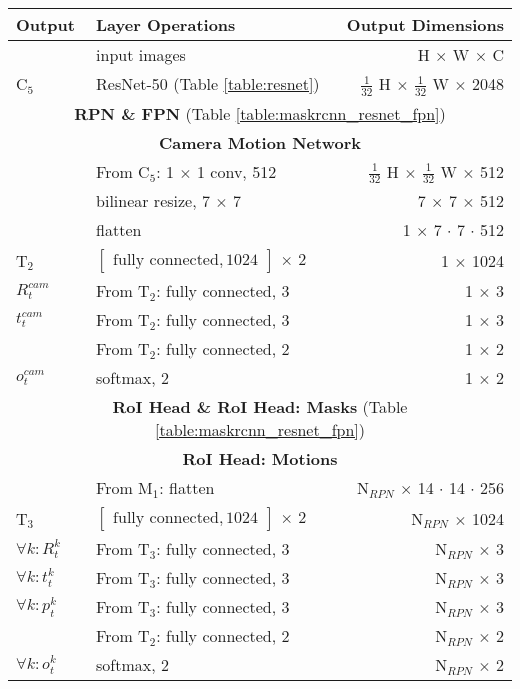 {
\begin{table}[h]
\centering
\begin{tabular}{llr}
\toprule
\textbf{Output} & \textbf{Layer Operations} & \textbf{Output Dimensions} \\
\midrule\midrule
& input images & H $\times$ W $\times$ C \\
\midrule
C$_5$ & ResNet-50 (Table \ref{table:resnet}) & $\tfrac{1}{32}$ H $\times$ $\tfrac{1}{32}$ W $\times$ 2048 \\
\midrule
\multicolumn{3}{c}{\textbf{RPN \& FPN} (Table \ref{table:maskrcnn_resnet_fpn})} \\
\midrule
\multicolumn{3}{c}{\textbf{Camera Motion Network}}\\
\midrule
& From C$_5$: 1 $\times$ 1 conv, 512 & $\tfrac{1}{32}$ H $\times$ $\tfrac{1}{32}$ W $\times$ 512 \\
& bilinear resize, 7 $\times$ 7 & 7 $\times$ 7 $\times$ 512 \\
& flatten & 1 $\times$ 7 $\cdot$ 7 $\cdot$ 512 \\
T$_2$ & $\begin{bmatrix}\textrm{fully connected}, 1024\end{bmatrix}$ $\times$ 2  & 1 $\times$ 1024 \\
$R_t^{cam}$& From T$_2$: fully connected, 3 & 1 $\times$ 3 \\
$t_t^{cam}$& From T$_2$: fully connected, 3 & 1 $\times$ 3 \\
& From T$_2$: fully connected, 2 & 1 $\times$ 2 \\
$o_t^{cam}$& softmax, 2 & 1 $\times$ 2 \\
\midrule
\multicolumn{3}{c}{\textbf{RoI Head \& RoI Head: Masks} (Table \ref{table:maskrcnn_resnet_fpn})} \\
\midrule
\multicolumn{3}{c}{\textbf{RoI Head: Motions}}\\
\midrule
& From M$_1$: flatten & N$_{RPN}$ $\times$ 14 $\cdot$ 14 $\cdot$ 256 \\
T$_3$ & $\begin{bmatrix}\textrm{fully connected}, 1024\end{bmatrix}$ $\times$ 2 & N$_{RPN}$ $\times$ 1024 \\
$\forall k: R_t^k$ & From T$_3$: fully connected, 3 & N$_{RPN}$ $\times$ 3 \\
$\forall k: t_t^k$ & From T$_3$: fully connected, 3 & N$_{RPN}$ $\times$ 3 \\
$\forall k: p_t^k$ & From T$_3$: fully connected, 3 & N$_{RPN}$ $\times$ 3 \\
& From T$_2$: fully connected, 2 & N$_{RPN}$ $\times$ 2 \\
$\forall k: o_t^k$ & softmax, 2 & N$_{RPN}$ $\times$ 2 \\


\end{tabular}
\end{table}}
